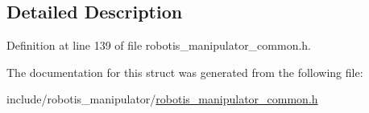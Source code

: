 \subsection{Detailed Description}


Definition at line 139 of file robotis\+\_\+manipulator\+\_\+common.\+h.



The documentation for this struct was generated from the following file\+:\begin{DoxyCompactItemize}
\item 
include/robotis\+\_\+manipulator/\hyperlink{robotis__manipulator__common_8h}{robotis\+\_\+manipulator\+\_\+common.\+h}\end{DoxyCompactItemize}

